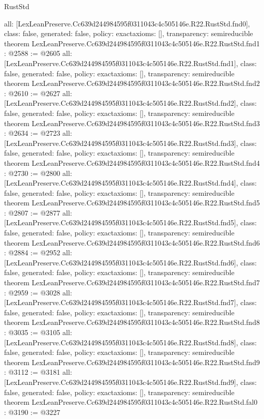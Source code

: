 \begin{lexlean}{RustStd}
\begin{coremodule}
{  all: [LexLeanPreserve.Cc639d244984595f0311043c4c505146e.R22.RustStd.fnd0],
  class: false,
  generated: false,
  policy: exact{axioms: []},
  transparency: semireducible
}
theorem LexLeanPreserve.Cc639d244984595f0311043c4c505146e.R22.RustStd.fnd1 : @2588 := @2605 {
  all: [LexLeanPreserve.Cc639d244984595f0311043c4c505146e.R22.RustStd.fnd1],
  class: false,
  generated: false,
  policy: exact{axioms: []},
  transparency: semireducible
}
theorem LexLeanPreserve.Cc639d244984595f0311043c4c505146e.R22.RustStd.fnd2 : @2610 := @2627 {
  all: [LexLeanPreserve.Cc639d244984595f0311043c4c505146e.R22.RustStd.fnd2],
  class: false,
  generated: false,
  policy: exact{axioms: []},
  transparency: semireducible
}
theorem LexLeanPreserve.Cc639d244984595f0311043c4c505146e.R22.RustStd.fnd3 : @2634 := @2723 {
  all: [LexLeanPreserve.Cc639d244984595f0311043c4c505146e.R22.RustStd.fnd3],
  class: false,
  generated: false,
  policy: exact{axioms: []},
  transparency: semireducible
}
theorem LexLeanPreserve.Cc639d244984595f0311043c4c505146e.R22.RustStd.fnd4 : @2730 := @2800 {
  all: [LexLeanPreserve.Cc639d244984595f0311043c4c505146e.R22.RustStd.fnd4],
  class: false,
  generated: false,
  policy: exact{axioms: []},
  transparency: semireducible
}
theorem LexLeanPreserve.Cc639d244984595f0311043c4c505146e.R22.RustStd.fnd5 : @2807 := @2877 {
  all: [LexLeanPreserve.Cc639d244984595f0311043c4c505146e.R22.RustStd.fnd5],
  class: false,
  generated: false,
  policy: exact{axioms: []},
  transparency: semireducible
}
theorem LexLeanPreserve.Cc639d244984595f0311043c4c505146e.R22.RustStd.fnd6 : @2884 := @2952 {
  all: [LexLeanPreserve.Cc639d244984595f0311043c4c505146e.R22.RustStd.fnd6],
  class: false,
  generated: false,
  policy: exact{axioms: []},
  transparency: semireducible
}
theorem LexLeanPreserve.Cc639d244984595f0311043c4c505146e.R22.RustStd.fnd7 : @2959 := @3028 {
  all: [LexLeanPreserve.Cc639d244984595f0311043c4c505146e.R22.RustStd.fnd7],
  class: false,
  generated: false,
  policy: exact{axioms: []},
  transparency: semireducible
}
theorem LexLeanPreserve.Cc639d244984595f0311043c4c505146e.R22.RustStd.fnd8 : @3035 := @3105 {
  all: [LexLeanPreserve.Cc639d244984595f0311043c4c505146e.R22.RustStd.fnd8],
  class: false,
  generated: false,
  policy: exact{axioms: []},
  transparency: semireducible
}
theorem LexLeanPreserve.Cc639d244984595f0311043c4c505146e.R22.RustStd.fnd9 : @3112 := @3181 {
  all: [LexLeanPreserve.Cc639d244984595f0311043c4c505146e.R22.RustStd.fnd9],
  class: false,
  generated: false,
  policy: exact{axioms: []},
  transparency: semireducible
}
theorem LexLeanPreserve.Cc639d244984595f0311043c4c505146e.R22.RustStd.fal0 : @3190 := @3227 {
}
\end{coremodule}
\end{lexlean}
